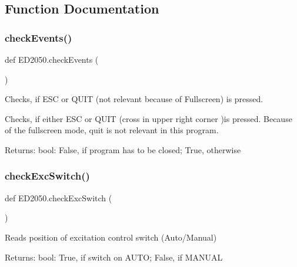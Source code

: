 \subsection{Function Documentation}
\mbox{\label{namespaceED2050_a5310c7dde66183f64bc856c9fdc3f17a}} 
\subsubsection{\texorpdfstring{check\+Events()}{checkEvents()}}
{\footnotesize\ttfamily def E\+D2050.\+check\+Events (\begin{DoxyParamCaption}{ }\end{DoxyParamCaption})}

\begin{DoxyVerb}Checks, if ESC or QUIT (not relevant because of Fullscreen) is pressed.

Checks, if either ESC or QUIT (cross in upper right corner )is pressed.
Because of the fullscreen mode, quit is not relevant in this program.

Returns:
    bool: False, if program has to be closed; True, otherwise
\end{DoxyVerb}
 \mbox{\label{namespaceED2050_af7a9f53151313470ed08a3a67e8b05e6}} 
\subsubsection{\texorpdfstring{check\+Exc\+Switch()}{checkExcSwitch()}}
{\footnotesize\ttfamily def E\+D2050.\+check\+Exc\+Switch (\begin{DoxyParamCaption}{ }\end{DoxyParamCaption})}

\begin{DoxyVerb}Reads position of excitation control switch (Auto/Manual)

Returns:
    bool: True, if switch on AUTO; False, if MANUAL
\end{DoxyVerb}
 \mbox{\label{namespaceED2050_ac340134ae43a853d32558cec034035ee}} 
